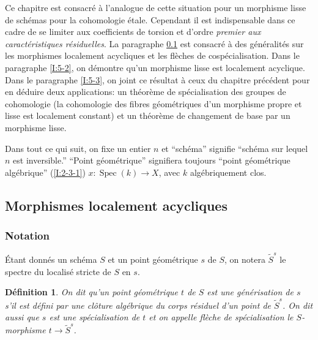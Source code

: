 \documentclass{book}
\DeclareMathOperator{\spec}{Spec}
\newtheorem{definition}[subsubsection]{Définition}
\begin{document}
Ce chapitre est consacré à l'analogue de cette situation pour un morphisme 
lisse de schémas pour la cohomologie étale. Cependant il est indispensable 
dans ce cadre de se limiter aux coefficients de torsion et d'ordre \emph{premier aux caractéristiques résiduelles}. La paragraphe \ref{I:5-1} est consacré 
à des généralités sur les morphismes localement acycliques et les 
flèches de cospécialisation. Dans le paragraphe \ref{I:5-2}, on démontre 
qu'un morphisme lisse est localement acyclique. Dans le paragraphe \ref{I:5-3}, on 
joint ce résultat à ceux du chapitre précédent pour en déduire deux 
applications: un théorème de spécialisation des groupes de cohomologie (la 
cohomologie des fibres géométriques d'un morphisme propre et lisse est 
localement constant) et un théorème de changement de base par un morphisme 
lisse. 

Dans tout ce qui suit, on fixe un entier $n$ et ``schéma'' signifie ``schéma 
sur lequel $n$ est inversible.'' ``Point géométrique'' signifiera toujours 
``point géométrique algébrique'' (\ref{I:2-3-1}) $x:\spec(k)\to X$, avec $k$ 
algébriquement clos. 










\subsection{Morphismes localement acycliques}\label{I:5-1}





\subsubsection{Notation}\label{I:5-1-1}

Étant donnés un schéma $S$ et un point géométrique $s$ de $S$, on 
notera $\widetilde S^s$ le spectre du localisé stricte de $S$ en $s$. 





\begin{definition}\label{I:5-1-2}
On dit qu'un point géométrique $t$ de $S$ est une \emph{générisation} de 
$s$ s'il est défini par une clôture algébrique du corps résiduel d'un 
point de $\widetilde S^s$. On dit aussi que $s$ est une \emph{spécialisation} 
de $t$ et on appelle \emph{flèche de spécialisation} le $S$-morphisme 
$t\to \widetilde S^s$. 
\end{definition}
\end{document}
